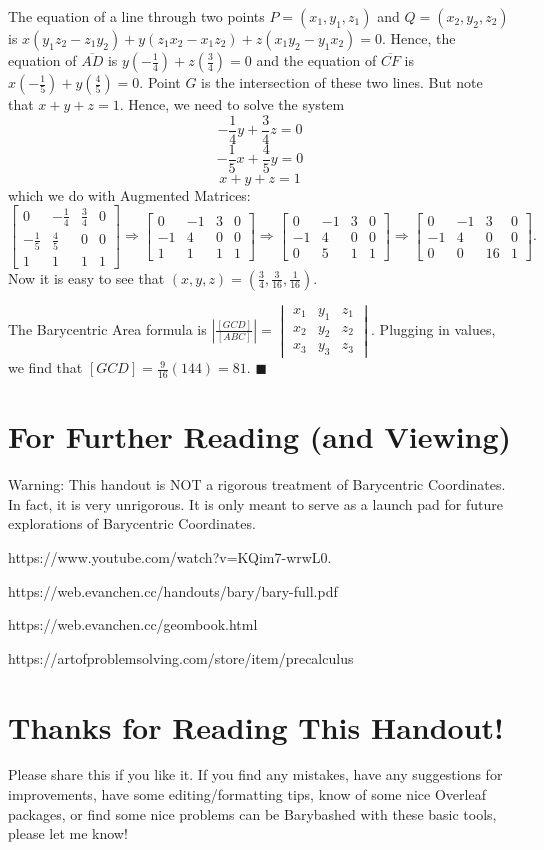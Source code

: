 \documentclass{article}
\begin{document}
The equation of a line through two points $P=(x_1,y_1,z_1)$ and $Q=(x_2,y_2,z_2)$ is $x(y_1z_2 -z_1y_2)+y(z_1x_2-x_1z_2)+z(x_1y_2-y_1x_2)=0$. Hence, the equation of $\overline {AD}$ is $y(-\frac 14)+z(\frac 34)=0$ and the equation of $\overline{CF}$ is $x( -\frac 15)+y(\frac 45)=0$. Point $G$ is the intersection of these two lines. But note that $x+y+z=1$. Hence, we need to solve the system$$-\frac 14 y+\frac 34 z=0$$$$-\frac 15 x+\frac 45 y=0$$$$x+y+z=1$$which we do with Augmented Matrices:$$ \begin{bmatrix}
0 & -\frac 14 & \frac 34 &0\\
-\frac 15& \frac 45 &0  &0\\
1&1&1&1
\end{bmatrix}\Rightarrow \begin{bmatrix}
0 & -1 & 3 &0\\
-1& 4 & 0 &0\\
1&1&1&1
\end{bmatrix}\Rightarrow \begin{bmatrix}
0 & -1 & 3 &0\\
-1& 4 & 0 &0\\
0&5&1&1
\end{bmatrix}\Rightarrow \begin{bmatrix}
0 & -1 & 3 &0\\
-1& 4 & 0 &0\\
0&0&16&1
\end{bmatrix}.$$Now it is easy to see that $(x,y,z)=(\frac 34,\frac {3}{16},\frac {1}{16})$.

The Barycentric Area formula is $|\frac{[GCD]}{[ABC]}|=\begin{vmatrix}
x_{1} &y_{1}  &z_{1} \\ 
x_{2} &y_{2}  &z_{2} \\ 
 x_{3}& y_{3} & z_{3}
\end{vmatrix}$. Plugging in values, we find that $[GCD]=\frac{9}{16}(144)=81$. $\blacksquare$
\section{For Further Reading (and Viewing)}
Warning: This handout is NOT a rigorous treatment of Barycentric Coordinates. In fact, it is very unrigorous. It is only meant to serve as a launch pad for future explorations of Barycentric Coordinates.
\vspace{.2in}


https://www.youtube.com/watch?v=KQim7-wrwL0.

https://web.evanchen.cc/handouts/bary/bary-full.pdf

https://web.evanchen.cc/geombook.html

https://artofproblemsolving.com/store/item/precalculus

\section{Thanks for Reading This Handout!}Please share this if you like it. If you find any mistakes, have any suggestions for improvements, have some editing/formatting tips, know of some nice Overleaf packages, or find some nice problems can be Barybashed with these basic tools, please let me know! 
\end{document}
